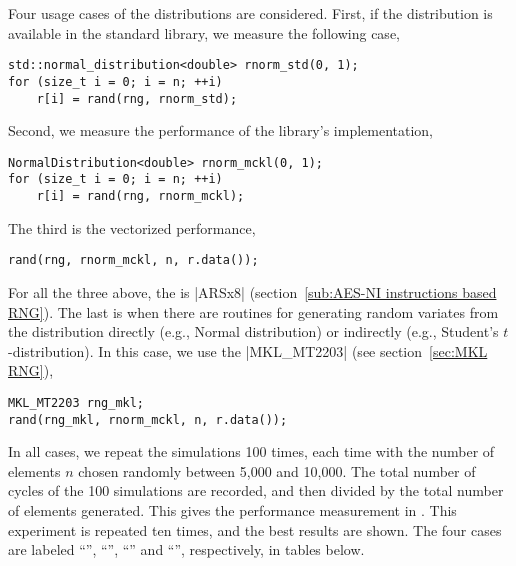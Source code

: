 Four usage cases of the distributions are considered. First, if the
distribution is available in the standard library, we measure the following
case,
\begin{verbatim}
std::normal_distribution<double> rnorm_std(0, 1);
for (size_t i = 0; i = n; ++i)
    r[i] = rand(rng, rnorm_std);
\end{verbatim}
Second, we measure the performance of the library's implementation,
\begin{verbatim}
NormalDistribution<double> rnorm_mckl(0, 1);
for (size_t i = 0; i = n; ++i)
    r[i] = rand(rng, rnorm_mckl);
\end{verbatim}
The third is the vectorized performance,
\begin{verbatim}
rand(rng, rnorm_mckl, n, r.data());
\end{verbatim}
For all the three above, the \rng is |ARSx8| (section~\ref{sub:AES-NI
instructions based RNG}). The last is when there are \mkl routines for
generating random variates from the distribution directly (e.g., Normal
distribution) or indirectly (e.g., Student's $t$-distribution). In this case,
we use the \rng |MKL_MT2203| (see section~\ref{sec:MKL RNG}),
\begin{verbatim}
MKL_MT2203 rng_mkl;
rand(rng_mkl, rnorm_mckl, n, r.data());
\end{verbatim}
In all cases, we repeat the simulations 100 times, each time with the number of
elements $n$ chosen randomly between 5,000 and 10,000. The total number of
cycles of the 100 simulations are recorded, and then divided by the total
number of elements generated. This gives the performance measurement in \cpe.
This experiment is repeated ten times, and the best results are shown. The four
cases are labeled ``\std'', ``\mckl'', ``\batch'' and ``\mkl'', respectively,
in tables below.

